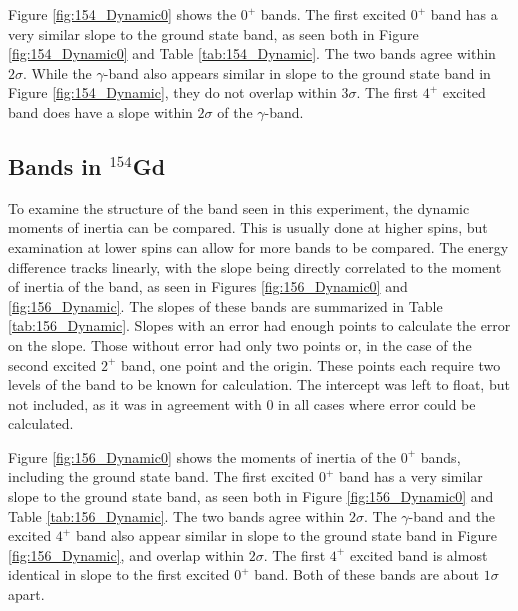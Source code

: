 





Figure \ref{fig:154_Dynamic0} shows the $0^+$ bands. The first excited $0^+$ band has a very similar slope to the ground state band, as seen both in Figure \ref{fig:154_Dynamic0} and Table \ref{tab:154_Dynamic}. The two bands agree within $2\sigma$. While the $\gamma$-band also appears similar in slope to the ground state band in Figure \ref{fig:154_Dynamic}, they do not overlap within $3\sigma$. The first $4^+$ excited band does have a slope within $2\sigma$ of the $\gamma$-band.

\subsection{Bands in $^{154}$Gd}
\label{sec:156_Dynamic}

To examine the structure of the band seen in this experiment, the dynamic moments of inertia can be compared. This is usually done at higher spins, but examination at lower spins can allow for more bands to be compared. The energy difference tracks linearly, with the slope being directly correlated to the moment of inertia of the band, as seen in Figures \ref{fig:156_Dynamic0} and \ref{fig:156_Dynamic}. The slopes of these bands are summarized in Table \ref{tab:156_Dynamic}. Slopes with an error had enough points to calculate the error on the slope. Those without error had only two points or, in the case of the second excited $2^+$ band, one point and the origin. These points each require two levels of the band to be known for calculation. The intercept was left to float, but not included, as it was in agreement with 0 in all cases where error could be calculated.







Figure \ref{fig:156_Dynamic0} shows the moments of inertia of the $0^+$ bands, including the ground state band. The first excited $0^+$ band has a very similar slope to the ground state band, as seen both in Figure \ref{fig:156_Dynamic0} and Table \ref{tab:156_Dynamic}. The two bands agree within $2\sigma$. The $\gamma$-band and the excited $4^+$ band also appear similar in slope to the ground state band in Figure \ref{fig:156_Dynamic}, and overlap within $2\sigma$. The first $4^+$ excited band is almost identical in slope to the first excited $0^+$ band. Both of these bands are about $1\sigma$ apart.